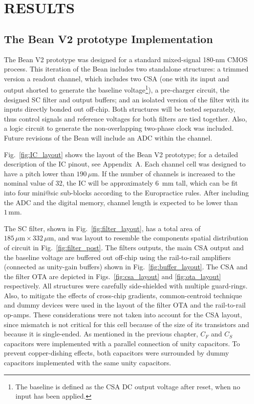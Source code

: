\chapter{RESULTS}
\label{chapter:results}

\section{The Bean V2 prototype Implementation}
The Bean V2 prototype was designed for a standard mixed-signal 180-nm CMOS process. This iteration of the Bean includes two standalone structures: a trimmed version a readout channel, which includes two CSA (one with its input and output shorted to generate the baseline voltage\footnote{The baseline is defined as the CSA DC output voltage after reset, when no input has been applied.}), a pre-charger circuit, the designed SC filter and output buffers; and an isolated version of the filter with its inputs directly bonded out off-chip.  Both structures will be tested separately, thus control signals and reference voltages for both filters are tied together. Also, a logic circuit to generate the non-overlapping two-phase clock was included. Future revisions of the Bean will include an ADC within the channel.

Fig.~\ref{fig:IC_layout} shows the layout of the Bean V2 prototype; for a detailed description of the IC pinout, see Appendix~A. Each channel cell was designed to have a pitch lower than $190\,\mu\text{m}$. If the number of channels is increased to the nominal value of 32, the IC will be approximately 6~mm tall, which can be fit into four mini@sic sub-blocks according to the Europractice rules. After including the ADC and the digital memory, channel length is expected to be lower than $1\,\text{mm}$.

The SC filter, shown in Fig.~\ref{fig:filter_layout}, has a total area of $185\,\mu\text{m}\times 332\,\mu\text{m}$, and was layout to resemble the components spatial distribution of circuit in Fig.~\ref{fig:filter_post}. The filters outputs, the main CSA output and the baseline voltage are buffered out off-chip using the rail-to-rail amplifiers (connected as unity-gain buffers) shown in Fig.~\ref{fig:buffer_layout}. The CSA and the filter OTA are depicted in Figs.~\ref{fig:csa_layout} and \ref{fig:ota_layout} respectively. All structures were carefully side-shielded with multiple guard-rings. Also, to mitigate the effects of cross-chip gradients,  common-centroid technique and dummy devices were used in the layout of the filter OTA and the rail-to-rail op-amps. These considerations were not taken into account for the CSA layout, since mismatch is not critical for this cell because of the size of its transistors and because it is single-ended. As mentioned in the previous chapter, $C_F$ and $C_S$ capacitors were implemented with a parallel connection of unity capacitors. To prevent copper-dishing effects, both capacitors were surrounded by dummy capacitors implemented with the same unity capacitors.

